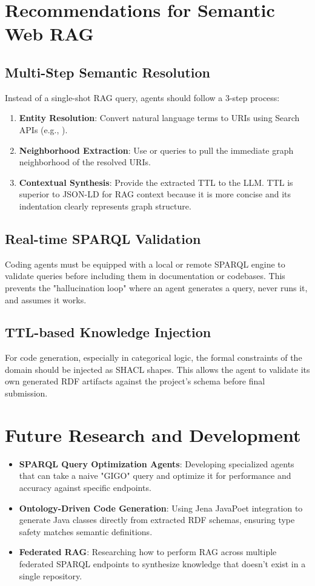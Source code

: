 \section{Recommendations for Semantic Web RAG}

\subsection{Multi-Step Semantic Resolution}
Instead of a single-shot RAG query, agents should follow a 3-step process:
\begin{enumerate}
    \item \textbf{Entity Resolution}: Convert natural language terms to URIs using Search APIs (e.g., ).
    \item \textbf{Neighborhood Extraction}: Use  or  queries to pull the immediate graph neighborhood of the resolved URIs.
    \item \textbf{Contextual Synthesis}: Provide the extracted TTL to the LLM. TTL is superior to JSON-LD for RAG context because it is more concise and its indentation clearly represents graph structure.
\end{enumerate}

\subsection{Real-time SPARQL Validation}
Coding agents must be equipped with a local or remote SPARQL engine to validate queries before including them in documentation or codebases. This prevents the "hallucination loop" where an agent generates a query, never runs it, and assumes it works.

\subsection{TTL-based Knowledge Injection}
For code generation, especially in categorical logic, the formal constraints of the domain should be injected as SHACL shapes. This allows the agent to validate its own generated RDF artifacts against the project's schema before final submission.

\section{Future Research and Development}
\begin{itemize}
    \item \textbf{SPARQL Query Optimization Agents}: Developing specialized agents that can take a naive "GIGO" query and optimize it for performance and accuracy against specific endpoints.
    \item \textbf{Ontology-Driven Code Generation}: Using Jena JavaPoet integration to generate Java classes directly from extracted RDF schemas, ensuring type safety matches semantic definitions.
    \item \textbf{Federated RAG}: Researching how to perform RAG across multiple federated SPARQL endpoints to synthesize knowledge that doesn't exist in a single repository.
\end{itemize}
